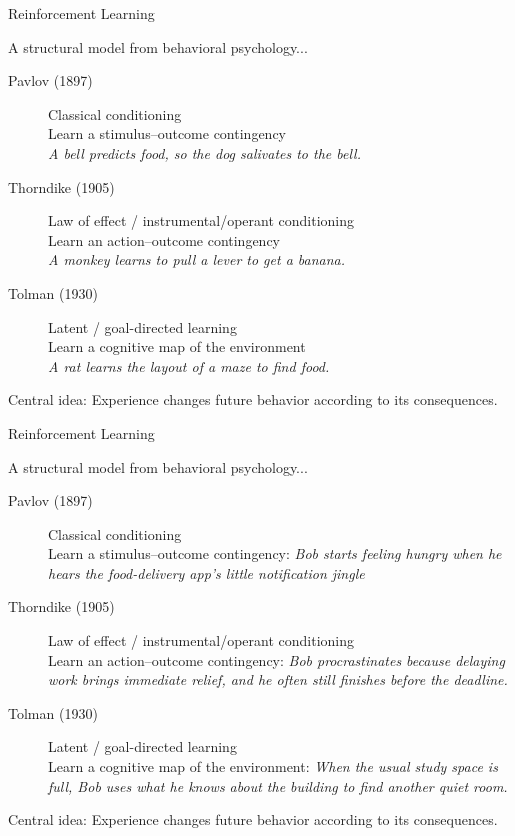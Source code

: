 \documentclass[aspectratio=169]{beamer}%
\begin{document}
\begin{frame}{Reinforcement Learning}
\small
\begin{block}{A structural model from behavioral psychology...}
\begin{description}
    \item[Pavlov (1897)] Classical conditioning\\
    Learn a stimulus--outcome contingency\\
    \textit{A bell predicts food, so the dog salivates to the bell.}
    \item[Thorndike (1905)] Law of effect / instrumental/operant conditioning\\
    Learn an action--outcome contingency\\
    \textit{A monkey learns to pull a lever to get a banana.}
    \item[Tolman (1930)] Latent / goal-directed learning\\
    Learn a cognitive map of the environment\\
    \textit{A rat learns the layout of a maze to find food.}
\end{description}
\end{block}
\begin{alertblock}{Central idea:}
Experience changes future behavior according to its consequences.
\end{alertblock}
\end{frame}

\begin{frame}{Reinforcement Learning}
\small
\begin{block}{A structural model from behavioral psychology...}
\begin{description}
    \item[Pavlov (1897)] Classical conditioning\\
    Learn a stimulus--outcome contingency: 
    \textit{Bob starts feeling hungry when he hears the food-delivery app's little notification jingle}
    \item[Thorndike (1905)] Law of effect / instrumental/operant conditioning\\
    Learn an action--outcome contingency: 
    \textit{Bob procrastinates because delaying work brings immediate relief, and he often still finishes before the deadline.}
    \item[Tolman (1930)] Latent / goal-directed learning\\
    Learn a cognitive map of the environment: 
    \textit{When the usual study space is full, Bob uses what he knows about the building to find another quiet room.}
\end{description}
\end{block}
\begin{alertblock}{Central idea:}
Experience changes future behavior according to its consequences.
\end{alertblock}
\end{frame}
\end{document}

